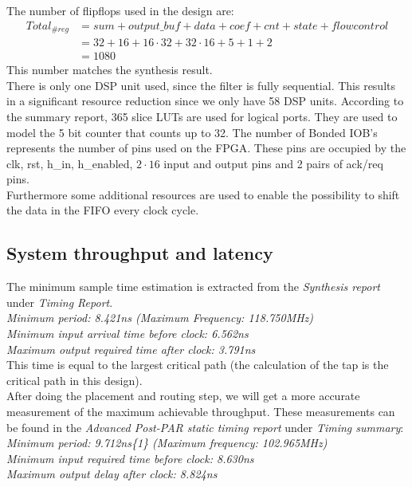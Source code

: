 \documentclass[a4paper,twoside,11pt, fleqn]{article}
\begin{document}
The number of flipflops used in the design are:
\begin{align*}
Total_{\#reg}	&= sum + output\_buf + data + coef + cnt + state + flow control\\
			&= 32 + 16 + 16\cdot 32 + 32\cdot 16 + 5 + 1 + 2\\
			&= 1080
\end{align*}
This number matches the synthesis result.\\

There is only one DSP unit used, since the filter is fully sequential. This results in a significant resource reduction since we only have 58 DSP units. According to the summary report, 365 slice LUTs are used for logical ports. They are used to model the 5 bit counter that counts up to 32. The number of Bonded IOB's represents the number of pins used on the FPGA. These pins are occupied by the clk, rst, h\_in, h\_enabled,  $2\cdot 16$ input and output pins and 2 pairs of ack/req pins.\\

Furthermore some additional resources are used to enable the possibility to shift the data in the FIFO every clock cycle.

\subsection{System throughput and latency}
\label{sec:3athrolat}
The minimum sample time estimation is extracted from the \textit{Synthesis report} under \textit{Timing Report}.\\

   \textit{Minimum period: 8.421ns (Maximum Frequency: 118.750MHz)\\
   Minimum input arrival time before clock: 6.562ns\\
   Maximum output required time after clock: 3.791ns}\\

This time is equal to the largest critical path (the calculation of the tap is the critical path in this design).\\

After doing the placement and routing step, we will get a more accurate measurement of the maximum achievable throughput. These measurements can be found in the \textit{Advanced Post-PAR static timing report} under \textit{Timing summary}:\\

\textit{Minimum period:   9.712ns\{1\}   (Maximum frequency: 102.965MHz)\\
   Minimum input required time before clock:   8.630ns\\
   Maximum output delay after clock:   8.824ns}\\
\end{document}
